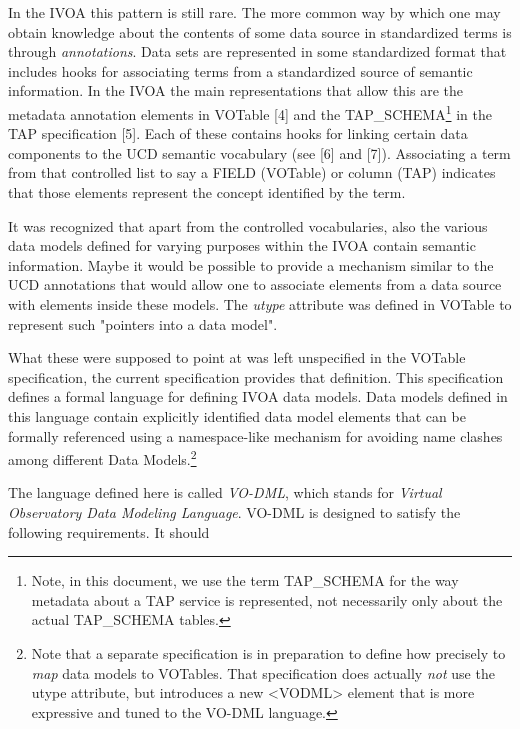 \documentclass[10pt,a4paper]{ivoa}
\begin{document}
In the IVOA this pattern is still rare. The more common way by which one
may obtain knowledge about the contents of some data source in
standardized terms is through \emph{annotations}. Data sets are
represented in some standardized format that includes hooks for
associating terms from a standardized source of semantic information. In
the IVOA the main representations that allow this are the metadata
annotation elements in VOTable {[}4{]} and the TAP\_SCHEMA\footnote{Note,
  in this document, we use the term TAP\_SCHEMA for the way metadata
  about a TAP service is represented, not necessarily only about the
  actual TAP\_SCHEMA tables.} in the TAP specification {[}5{]}. Each of
these contains hooks for linking certain data components to the UCD
semantic vocabulary (see {[}6{]} and {[}7{]}). Associating a term from
that controlled list to say a FIELD (VOTable) or column (TAP) indicates
that those elements represent the concept identified by the term.

It was recognized that apart from the controlled vocabularies, also the
various data models defined for varying purposes within the IVOA contain
semantic information. Maybe it would be possible to provide a mechanism
similar to the UCD annotations that would allow one to associate
elements from a data source with elements inside these models. The
\emph{utype} attribute was defined in VOTable to represent such
"pointers into a data model".

What these were supposed to point at was left unspecified in the VOTable
specification, the current specification provides that definition. This
specification defines a formal language for defining IVOA data models.
Data models defined in this language contain explicitly identified data
model elements that can be formally referenced using a namespace-like
mechanism for avoiding name clashes among different Data
Models.\footnote{Note that a separate specification is in preparation to
  define how precisely to \emph{map} data models to VOTables. That
  specification does actually \emph{not} use the utype attribute, but
  introduces a new \textless VODML\textgreater{} element that is more
  expressive and tuned to the VO-DML language.}

The language defined here is called \emph{VO-DML}, which stands for
\emph{Virtual Observatory Data Modeling Language}. VO-DML is designed to
satisfy the following requirements. It should
\end{document}
